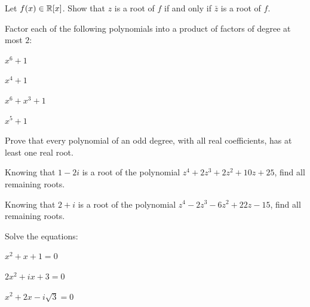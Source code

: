 \begin{exercise}
Let $f(x)\in\mathbb{R}[x]$. Show that $z$ is a root of $f$ if and only if $\bar z$ is a root of $f$.
\end{exercise}

\begin{exercise}
Factor each of the following polynomials into a product of factors of degree at most $2$:
\begin{enumerate*}[label=\alph*), itemjoin={\qquad}]
\item $x^6+1$
\item $x^4+1$
\item $x^6+x^3+1$
\item $x^5+1$
\end{enumerate*}
\end{exercise}

\begin{exercise}
Prove that every polynomial of an odd degree, with all real coefficients, has at least one real root.
\end{exercise}

\begin{exercise}
Knowing that $1-2i$ is a root of the polynomial $z^4+2z^3+2z^2+10z+25$, find all remaining roots.
\end{exercise}

\begin{exercise}
Knowing that $2+i$ is a root of the polynomial $z^4-2z^3-6z^2+22z-15$, find all remaining roots.
\end{exercise}

\begin{exercise}
Solve the equations:
\begin{enumerate*}[label=\alph*), itemjoin={\qquad}]
\item $x^2+x+1 = 0$
\item $2x^2+ix+3 = 0$
\item $x^2+2x-i\sqrt3 = 0$
\end{enumerate*}
\end{exercise}
